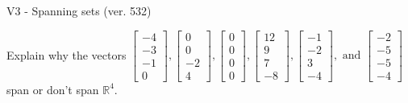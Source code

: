 \begin{exercise}
  \begin{exerciseTitle}V3 - Spanning sets (ver. 532)\end{exerciseTitle}
  \begin{exerciseStatement}
    Explain why the vectors \(\left[\begin{array}{r}
-4 \\
-3 \\
-1 \\
0
\end{array}\right] , \left[\begin{array}{r}
0 \\
0 \\
-2 \\
4
\end{array}\right] , \left[\begin{array}{r}
0 \\
0 \\
0 \\
0
\end{array}\right] , \left[\begin{array}{r}
12 \\
9 \\
7 \\
-8
\end{array}\right] , \left[\begin{array}{r}
-1 \\
-2 \\
3 \\
-4
\end{array}\right] , \text{ and } \left[\begin{array}{r}
-2 \\
-5 \\
-5 \\
-4
\end{array}\right]\) span or don't span \(\mathbb{R}^4\). 
	



\end{exerciseStatement}
\end{exercise}
